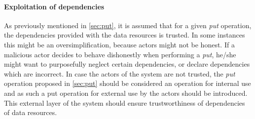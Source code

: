 \paragraph{Exploitation of dependencies} 
As previously mentioned in \autoref{sec:put}, it is assumed that for a given \emph{put} operation, the dependencies provided with the data resources is trusted. In some instances this might be an oversimplification, because actors might not be honest. If a malicious actor decides to behave dishonestly when performing a \emph{put}, he/she might want to purposefully neglect certain dependencies, or declare dependencies which are incorrect. In case the actors of the system are not trusted, the \emph{put} operation proposed in \autoref{sec:put} should be considered an operation for internal use and as such a put operation for external use by the actors should be introduced. This external layer of the system should ensure trustworthiness of dependencies of data resources.